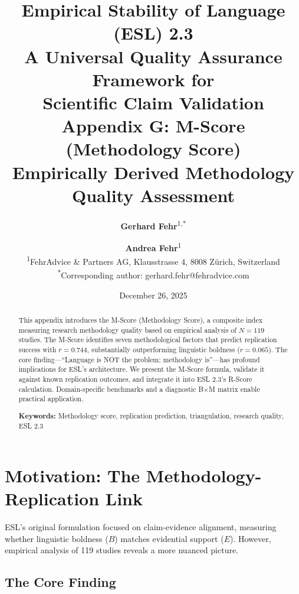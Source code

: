 \documentclass[11pt,a4paper]{article}
\title{%
    \Large \textbf{Empirical Stability of Language (ESL) 2.3} \\[0.5em]
    \large A Universal Quality Assurance Framework for \\
    Scientific Claim Validation \\[1em]
    \LARGE \textbf{Appendix G: M-Score (Methodology Score)} \\[0.3em]
    \large Empirically Derived Methodology Quality Assessment
}
\author{%
    \textbf{Gerhard Fehr}\textsuperscript{1,*} \and \textbf{Andrea Fehr}\textsuperscript{1} \\[0.5em]
    \textsuperscript{1}FehrAdvice \& Partners AG, Klausstrasse 4, 8008 Zürich, Switzerland \\[0.3em]
    \textsuperscript{*}Corresponding author: gerhard.fehr@fehradvice.com
}
\date{December 26, 2025}
\begin{document}
\maketitle


\begin{abstract}
\noindent
This appendix introduces the M-Score (Methodology Score), a composite index measuring research methodology quality based on empirical analysis of $N = 119$ studies. The M-Score identifies seven methodological factors that predict replication success with $r = 0.744$, substantially outperforming linguistic boldness ($r = 0.065$). The core finding---``Language is NOT the problem; methodology is''---has profound implications for ESL's architecture. We present the M-Score formula, validate it against known replication outcomes, and integrate it into ESL 2.3's R-Score calculation. Domain-specific benchmarks and a diagnostic B$\times$M matrix enable practical application.

\vspace{0.5em}
\noindent\textbf{Keywords:} Methodology score, replication prediction, triangulation, research quality, ESL 2.3
\end{abstract}

\tableofcontents
\newpage


\section{Motivation: The Methodology-Replication Link}
\label{sec:motivation}

ESL's original formulation focused on claim-evidence alignment, measuring whether linguistic boldness ($B$) matches evidential support ($E$). However, empirical analysis of 119 studies reveals a more nuanced picture.

\subsection{The Core Finding}
\end{document}
